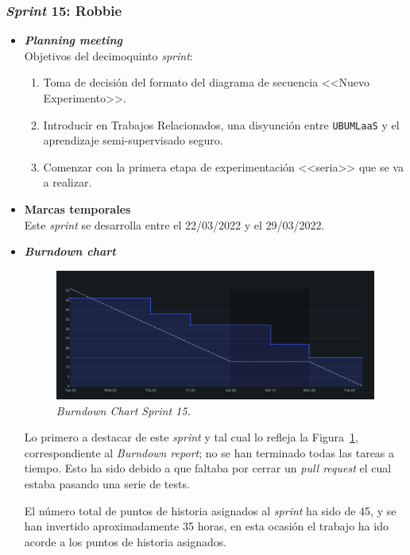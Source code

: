 \subsubsection{\textit{Sprint} 15: Robbie}
\begin{itemize}
\item \textbf{\textit{Planning meeting}}\\
Objetivos del decimoquinto \textit{sprint}:
\begin{enumerate}
\item Toma de decisión del formato del diagrama de secuencia <<Nuevo Experimento>>.
\item Introducir en Trabajos Relacionados, una disyunción entre \texttt{UBUMLaaS} y el aprendizaje semi-supervisado seguro.
\item Comenzar con la primera etapa de experimentación <<seria>> que se va a realizar.
\end{enumerate}

\item \textbf{Marcas temporales}\\
Este \textit{sprint} se desarrolla entre el 22/03/2022 y el 29/03/2022.

\item \textbf{\textit{Burndown chart}}\\
\begin{figure}
\begin{center}
\includegraphics[width=\textwidth]{../img/anexos/sprints/BD-Sprint15}
\caption{\textit{Burndown Chart Sprint 15.}}\label{fig:BD-Sprint15}
\end{center}
\end{figure}
Lo primero a destacar de este \textit{sprint} y tal cual lo refleja la Figura~\ref{fig:BD-Sprint15}, correspondiente al \textit{Burndown report}; no se han terminado todas las tareas a tiempo. Esto ha sido debido a que faltaba por cerrar un \textit{pull request} el cual estaba pasando una serie de tests.

El número total de puntos de historia asignados al \textit{sprint} ha sido de 45, y se han invertido aproximadamente 35 horas, en esta ocasión el trabajo ha ido acorde a los puntos de historia asignados.


\end{itemize}
